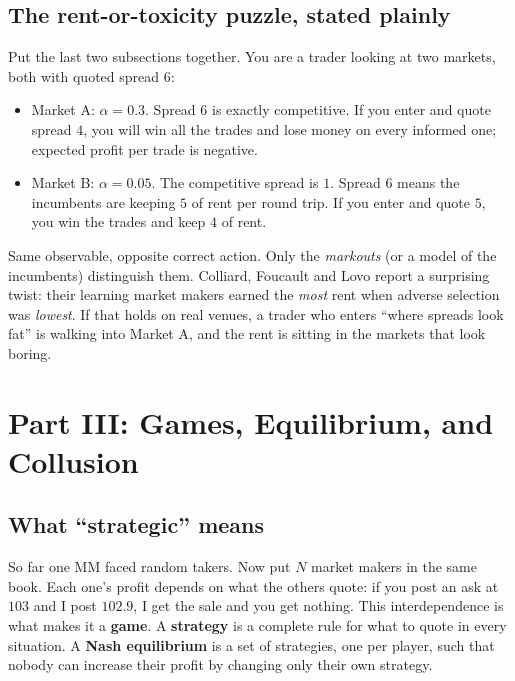 \documentclass[11pt]{article}
\begin{document}
\subsection{The rent-or-toxicity puzzle, stated plainly}\label{sec:puzzle}
Put the last two subsections together. You are a trader looking at two markets, both with quoted spread $6$:
\begin{itemize}
\item Market A: $\alpha=0.3$. Spread $6$ is exactly competitive. If you enter and quote spread $4$, you will win all the trades and lose money on every informed one; expected profit per trade is negative.
\item Market B: $\alpha=0.05$. The competitive spread is $1$. Spread $6$ means the incumbents are keeping $5$ of rent per round trip. If you enter and quote $5$, you win the trades and keep $4$ of rent.
\end{itemize}
Same observable, opposite correct action. Only the \emph{markouts} (or a model of the incumbents) distinguish them. Colliard, Foucault and Lovo report a surprising twist: their learning market makers earned the \emph{most} rent when adverse selection was \emph{lowest}. If that holds on real venues, a trader who enters ``where spreads look fat'' is walking into Market A, and the rent is sitting in the markets that look boring.

\section{Part III: Games, Equilibrium, and Collusion}

\subsection{What ``strategic'' means}
So far one MM faced random takers. Now put $N$ market makers in the same book. Each one's profit depends on what the others quote: if you post an ask at $103$ and I post $102.9$, I get the sale and you get nothing. This interdependence is what makes it a \textbf{game}. A \textbf{strategy} is a complete rule for what to quote in every situation. A \textbf{Nash equilibrium} is a set of strategies, one per player, such that nobody can increase their profit by changing only their own strategy.
\end{document}
